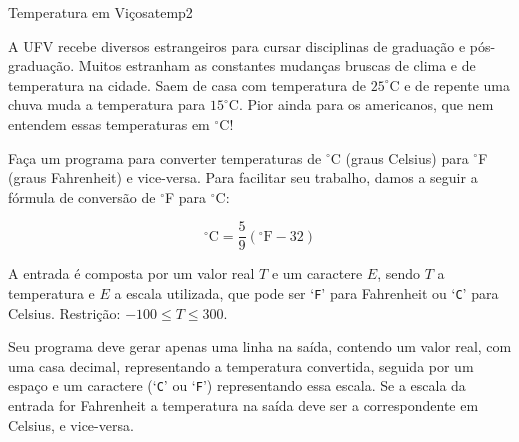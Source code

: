 \documentclass[12pt,a4paper,oneside]{article}
\begin{document}
\begin{problem}{Temperatura em Viçosa}{temp}{2}
 
A UFV recebe diversos estrangeiros para cursar disciplinas de graduação e pós-graduação. Muitos estranham as constantes mudanças bruscas de clima e de temperatura na cidade. Saem de casa com temperatura de $25^{\circ}$C e de repente uma chuva muda a temperatura para $15^{\circ}$C. Pior ainda para os americanos, que nem entendem essas temperaturas em $^{\circ}$C!

Faça um programa para converter temperaturas de $^{\circ}$C (graus Celsius) para $^{\circ}$F (graus Fahrenheit) e vice-versa. Para facilitar seu trabalho, damos a seguir a fórmula de conversão de $^{\circ}$F para $^{\circ}$C:

\[ \displaystyle ^{\circ}\text{C} = \frac{5}{9}(^{\circ}\text{F}-32) \]


%

\InputFile

A entrada é composta por um valor real $T$ e um caractere $E$, sendo $T$ a temperatura e $E$ a escala utilizada, que pode ser `\texttt{F}' para Fahrenheit ou `\texttt{C}' para Celsius. Restrição: $-100 \leq T \leq 300$.



\OutputFile

Seu programa deve gerar apenas uma linha na saída, contendo um valor real, com uma casa decimal, representando a temperatura convertida, seguida por um espaço e um caractere (`\texttt{C}' ou `\texttt{F}') representando essa escala. Se a escala da entrada for Fahrenheit a temperatura na saída deve ser a correspondente em Celsius, e vice-versa.

\Example

\begin{example}
%
\end{example}

\begin{example}
%
\end{example}


\end{problem}
\end{document}
